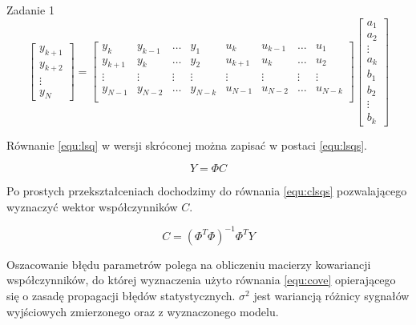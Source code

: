 \documentclass[12pt]{article}
\begin{document}
\begin{section}{Zadanie 1}
    \begin{equation}
      \begin{bmatrix}
        y_{k+1} \\ y_{k+2} \\ \vdots \\ y_N
      \end{bmatrix} =
      \begin{bmatrix}
        y_{k} & y_{k-1} & \hdots & y_{1} & u_{k} & u_{k-1} & \hdots & u_1 \\
        y_{k+1} & y_{k} & \hdots & y_{2} & u_{k+1} & u_{k} & \hdots & u_2 \\
        \vdots  & \vdots  & \vdots & \vdots & \vdots & \vdots  &\vdots  & \vdots \\
        y_{N-1} & y_{N-2} & \hdots & y_{N-k} & u_{N-1} & u_{N-2} & \hdots &
        u_{N-k} \\
      \end{bmatrix}
      \begin{bmatrix}
        a_1 \\ a_2 \\ \vdots \\ a_k \\ b_1 \\ b_2 \\ \vdots \\ b_k 
      \end{bmatrix}
      \label{equ:lsq}
    \end{equation}
    \vspace{0.2cm}
    
    \newpage
    
    Równanie \ref{equ:lsq} w wersji skróconej można zapisać w postaci
    \ref{equ:lsqs}.
    
    \begin{equation}
      Y = \Phi C
      \label{equ:lsqs} 
    \end{equation}
    \vspace{0.2cm}
    
    Po prostych przekształceniach dochodzimy do równania \ref{equ:clsqs} pozwalającego
    wyznaczyć wektor współczynników $C$.
    
    \begin{equation}
      C = (\Phi^T\Phi)^{-1}\Phi^T Y
      \label{equ:clsqs} 
    \end{equation}
    \vspace{0.2cm}
    
    Oszacowanie błędu parametrów polega na obliczeniu macierzy kowariancji
    współczynników, do której wyznaczenia użyto równania \ref{equ:cove}
    opierającego się o zasadę propagacji błędów statystycznych.
    $\sigma^2$ jest wariancją różnicy sygnałów wyjściowych zmierzonego oraz z
    wyznaczonego modelu.
    

\end{section}
\end{document}
